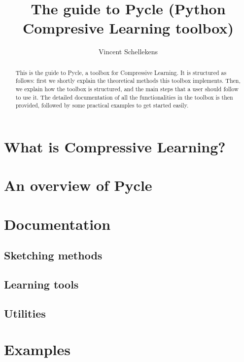 \documentclass[]{article}
\title{The guide to Pycle (\textbf{Py}thon \textbf{C}ompresive \textbf{Le}arning toolbox)}
\author{Vincent Schellekens}
\begin{document}

\maketitle

\begin{abstract}
	This is the guide to Pycle, a toolbox for Compressive Learning. It is structured as follows: first we shortly explain the theoretical methods this toolbox implements. Then, we explain how the toolbox is structured, and the main steps that a user should follow to use it. The detailed documentation of all the functionalities in the toolbox is then provided, followed by some practical examples to get started easily.
\end{abstract}


\section{What is Compressive Learning?}

\section{An overview of Pycle}


\section{Documentation}
\subsection{Sketching methods} 

\subsection{Learning tools} 

\subsection{Utilities} 

\section{Examples}
\end{document}

